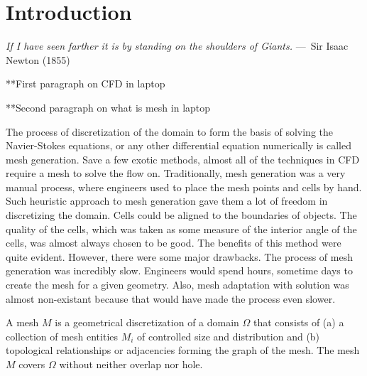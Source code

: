 
\chapter{Introduction}
\label{ch:Introduction}

\begin{epigraph}
    \emph{If I have seen farther it is by standing on the shoulders of
    Giants.} ---~Sir Isaac Newton (1855)
\end{epigraph}

**First paragraph on CFD in laptop

**Second paragraph on what is mesh in laptop

The process of discretization of the domain to form the basis of solving the Navier-Stokes equations, or any other differential equation numerically is called mesh generation. Save a few exotic methods, almost all of the techniques in CFD require a mesh to solve the flow on. Traditionally, mesh generation was a very manual process, where engineers used to place the mesh points and cells by hand. Such heuristic approach to mesh generation gave them a lot of freedom in discretizing the domain. Cells could be aligned to the boundaries of objects. The quality of the cells, which was taken as some measure of the interior angle of the cells, was almost always chosen to be good. The benefits of this method were quite evident. However, there were some major drawbacks. The process of mesh generation was incredibly slow. Engineers would spend hours, sometime days to create the mesh for a given geometry. Also, mesh adaptation with solution was almost non-existant because that would have made the process even slower.

\begin{definition}
A mesh $M$ is a geometrical discretization of a domain $\Omega$ that consists of (a) a collection of mesh entities $M_i$ of controlled size and distribution and (b) topological relationships or adjacencies forming the graph of the mesh. The mesh $M$ covers $\Omega$ without neither overlap nor hole.
\end{definition}

